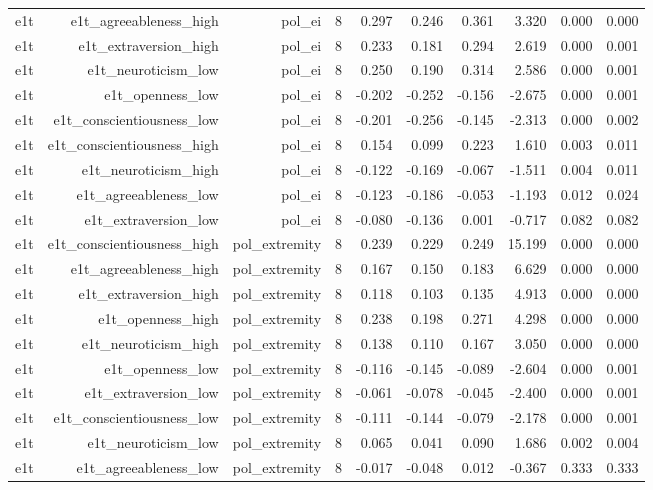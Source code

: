 \documentclass[11pt]{article}
\begin{document}
\begin{landscape}
\begin{longtable}{@{}lrrrrrrrrr@{}}
e1t & e1t\_agreeableness\_high & pol\_ei & 8 & 0.297 & 0.246 & 0.361 & 3.320 & 0.000 & 0.000 \\
e1t & e1t\_extraversion\_high & pol\_ei & 8 & 0.233 & 0.181 & 0.294 & 2.619 & 0.000 & 0.001 \\
e1t & e1t\_neuroticism\_low & pol\_ei & 8 & 0.250 & 0.190 & 0.314 & 2.586 & 0.000 & 0.001 \\
e1t & e1t\_openness\_low & pol\_ei & 8 & -0.202 & -0.252 & -0.156 & -2.675 & 0.000 & 0.001 \\
e1t & e1t\_conscientiousness\_low & pol\_ei & 8 & -0.201 & -0.256 & -0.145 & -2.313 & 0.000 & 0.002 \\
e1t & e1t\_conscientiousness\_high & pol\_ei & 8 & 0.154 & 0.099 & 0.223 & 1.610 & 0.003 & 0.011 \\
e1t & e1t\_neuroticism\_high & pol\_ei & 8 & -0.122 & -0.169 & -0.067 & -1.511 & 0.004 & 0.011 \\
e1t & e1t\_agreeableness\_low & pol\_ei & 8 & -0.123 & -0.186 & -0.053 & -1.193 & 0.012 & 0.024 \\
e1t & e1t\_extraversion\_low & pol\_ei & 8 & -0.080 & -0.136 & 0.001 & -0.717 & 0.082 & 0.082 \\
e1t & e1t\_conscientiousness\_high & pol\_extremity & 8 & 0.239 & 0.229 & 0.249 & 15.199 & 0.000 & 0.000 \\
e1t & e1t\_agreeableness\_high & pol\_extremity & 8 & 0.167 & 0.150 & 0.183 & 6.629 & 0.000 & 0.000 \\
e1t & e1t\_extraversion\_high & pol\_extremity & 8 & 0.118 & 0.103 & 0.135 & 4.913 & 0.000 & 0.000 \\
e1t & e1t\_openness\_high & pol\_extremity & 8 & 0.238 & 0.198 & 0.271 & 4.298 & 0.000 & 0.000 \\
e1t & e1t\_neuroticism\_high & pol\_extremity & 8 & 0.138 & 0.110 & 0.167 & 3.050 & 0.000 & 0.000 \\
e1t & e1t\_openness\_low & pol\_extremity & 8 & -0.116 & -0.145 & -0.089 & -2.604 & 0.000 & 0.001 \\
e1t & e1t\_extraversion\_low & pol\_extremity & 8 & -0.061 & -0.078 & -0.045 & -2.400 & 0.000 & 0.001 \\
e1t & e1t\_conscientiousness\_low & pol\_extremity & 8 & -0.111 & -0.144 & -0.079 & -2.178 & 0.000 & 0.001 \\
e1t & e1t\_neuroticism\_low & pol\_extremity & 8 & 0.065 & 0.041 & 0.090 & 1.686 & 0.002 & 0.004 \\
e1t & e1t\_agreeableness\_low & pol\_extremity & 8 & -0.017 & -0.048 & 0.012 & -0.367 & 0.333 & 0.333 \\

\end{longtable}
\end{landscape}
\end{document}
